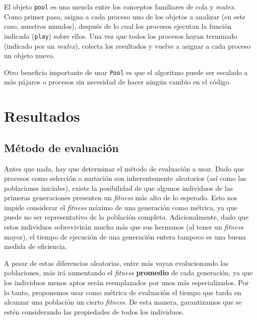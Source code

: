\documentclass[twocolumn,spanish]{revtex4-1}
\begin{document}
El objeto \texttt{pool} es una mezcla entre los conceptos familiares de cola y \textit{mutex}. Como primer paso, asigna a cada proceso uno de los objetos a analizar (en este caso, nuestros mundos), después de lo cual los procesos ejecutan la función indicada (\texttt{play}) sobre ellos. Una vez que todos los procesos hayan terminado (indicado por un \textit{mutex}), colecta los resultados y vuelve a asignar a cada proceso un objeto nuevo.

Otro beneficio importante de usar \texttt{Pool} es que el algoritmo puede ser escalado a más pájaros o procesos sin necesidad de hacer ningún cambio en el código.

\section{Resultados}
\subsection{Método de evaluación}
Antes que nada, hay que determinar el método de evaluación a usar. Dado que procesos como selección o mutación son inherentemente aleatorios (así como las poblaciones iniciales), existe la posibilidad de que algunos individuos de las primeras generaciones presenten un \textit{fitness} más alto de lo esperado. Esto nos impide considerar el \textit{fitness} máximo de una generación como métrica, ya que puede no ser representativo de la población completa. Adicionalmente, dado que estos individuos sobrevivirán mucho más que sus hermanos (al tener un \textit{fitness} mayor), el tiempo de ejecución de una generación entera tampoco es una buena medida de eficiencia.

A pesar de estas diferencias aleatorias, entre más vayan evolucionando las poblaciones, más irá aumentando el \textit{fitness} \textbf{promedio} de cada generación, ya que los individuos menos aptos serán reemplazados por unos más especializados. Por lo tanto, proponemos usar como métrica de evaluación el tiempo que tarda en alcanzar una población un cierto \textit{fitness}. De esta manera, garantizamos que se estén considerando las propiedades de todos los individuos.
\end{document}

